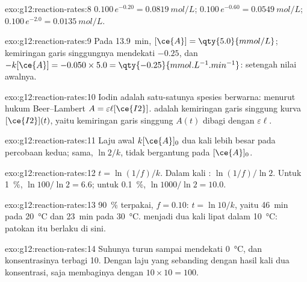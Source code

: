 \begin{solution}{exo:g12:reaction-rates:8}
$0.100\,e^{-0.20} = \qty{0.0819}{mol/L}$; $0.100\,e^{-0.60} =
\qty{0.0549}{mol/L}$; $0.100\,e^{-2.0} = \qty{0.0135}{mol/L}$.
\end{solution}

\begin{solution}{exo:g12:reaction-rates:9}
Pada \qty{13.9}{min}, $[\ce{A}] = \qty{5.0}{mmol/L}$; kemiringan garis
singgungnya mendekati $-0.25$, dan $-k[\ce{A}] = -0.050 \times 5.0 =
\qty{-0.25}{mmol.L^{-1}.min^{-1}}$: setengah nilai awalnya.
\end{solution}

\begin{solution}{exo:g12:reaction-rates:10}
Iodin adalah satu-satunya spesies berwarna: menurut hukum Beer--Lambert
$A = \varepsilon \ell [\ce{I2}]$.  adalah kemiringan
garis singgung kurva $[\ce{I2}](t)$, yaitu kemiringan garis singgung
$A(t)$ dibagi dengan $\varepsilon \ell$.
\end{solution}

\begin{solution}{exo:g12:reaction-rates:11}
Laju awal $k[\ce{A}]_0$ dua kali lebih besar pada percobaan kedua;  sama, $\ln 2 / k$, tidak bergantung pada $[\ce{A}]_0$.
\end{solution}

\begin{solution}{exo:g12:reaction-rates:12}
$t = \ln(1/f)/k$. Dalam kali : $\ln(1/f)/\ln 2$. Untuk
\qty{1}{\percent}, $\ln 100 / \ln 2 = 6.6$; untuk \qty{0.1}{\percent},
$\ln 1000 / \ln 2 =
10.0$.
\end{solution}

\begin{solution}{exo:g12:reaction-rates:13}
\qty{90}{\percent} terpakai, $f = 0.10$: $t = \ln 10 / k$, yaitu
\qty{46}{min} pada \qty{20}{\celsius} dan \qty{23}{min} pada
\qty{30}{\celsius}.  menjadi dua kali lipat dalam
\qty{10}{\celsius}: patokan itu berlaku di sini.
\end{solution}

\begin{solution}{exo:g12:reaction-rates:14}
Suhunya turun sampai mendekati \qty{0}{\celsius}, dan konsentrasinya
terbagi 10. Dengan laju yang sebanding dengan hasil kali dua
konsentrasi,  saja membaginya dengan $10 \times 10 = 100$.
\end{solution}

